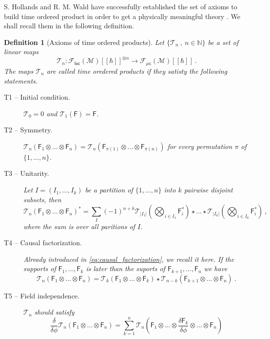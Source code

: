 \documentclass[11pt]{book}
\newcommand{\loc}{\mathsf{loc}}
\newcommand{\muc}{\mu\csf}
\newcommand{\abs}[1]{\left|#1\right|}
\newcommand{\Fcal}{\mathcal{F}}
\newcommand{\Mcal}{\mathcal{M}}
\newcommand{\Tcal}{\mathcal{T}}
\newcommand{\Nbb}{\mathbb{N}}
\newcommand{\Fsf}{\mathsf{F}}
\newcommand{\csf}{\mathsf{c}}
\theoremstyle{break}
\newtheorem{definition}{Definition}[chapter]
\begin{document}
\bigskip


S. Hollands and R. M. Wald have successfully established the set of axioms to build time ordered product in order to get a physically meaningful theory \cite{hollands_local_2001,hollands_existence_2002}. We shall recall them in the following definition.


\begin{definition}[Axioms of time ordered products]
Let $\{\Tcal_n \ , \ n \in \Nbb\}$ be a set of linear maps 
%
\begin{equation*}
\Tcal_n : \Fcal_\loc(\Mcal)[[\hbar]]^{\otimes n} \to \Fcal_{\muc}(\Mcal)[[\hbar]] \ . 
\end{equation*}
%
The maps $\Tcal_n$ are called time oredered products if they satisty the following statements.
%
\begin{description}
\item[T1 -- Initial condition.]\label{item:T1} $\Tcal_0 = 0$ and $\Tcal_1(\Fsf) = \Fsf$.
%
\item[T2 -- Symmetry.]\label{item:T2} $\Tcal_n(\Fsf_1\otimes\dots\otimes\Fsf_n) = \Tcal_n(\Fsf_{\pi(1)}\otimes\dots\otimes\Fsf_{\pi(n)})$ for every permutation $\pi$ of $\{1,\dots,n\}$.
%
\item[T3 -- Unitarity.]\label{item:T3} Let $I=(I_1,\dots,I_k)$ be a partition of $\{1,\dots,n\}$ into $k$ pairwise disjoint subsets, then
%
\begin{equation*}
\Tcal_n(\Fsf_1\otimes\dots\otimes\Fsf_n)^\ast = \sum_{I} (-1)^{n+k} \Tcal_{\abs{I_1}}\left(\bigotimes_{i\in I_1} \Fsf_i^\ast \right) \star \dots \star \Tcal_{\abs{I_k}}\left(\bigotimes_{i\in I_k} \Fsf_i^\ast \right) \ ,
\end{equation*}
%
where the sum is over all paritions of $I$.
%
\item[T4 -- Causal factorization.]\label{item:T4} Already introduced in \eqref{eq:causal_factorization}, we recall it here. If the supports of $\Fsf_1,\dots,\Fsf_k$ is later than the suports of $\Fsf_{k+1} , \dots , \Fsf_{n}$ we have
\begin{equation*}
\Tcal_n(\Fsf_1\otimes\dots\otimes\Fsf_n) = \Tcal_k(\Fsf_1\otimes\dots\otimes\Fsf_k) \star \Tcal_{n-k} (\Fsf_{k+1}\otimes\dots\otimes\Fsf_n) \ .
\end{equation*}
%
\item[T5 -- Field independence.]\label{item:T5} $\Tcal_n$ should satisfy
%
\begin{equation*}
\frac{\delta}{\delta\phi} \Tcal_n(\Fsf_1\otimes\dots\otimes\Fsf_n) = \sum_{k=1}^n \Tcal_n\left(\Fsf_1\otimes\dots\otimes \frac{\delta\Fsf_k}{\delta\phi} \otimes\dots\otimes\Fsf_n\right)

\end{equation*}
\end{description}
\end{definition}
\end{document}
